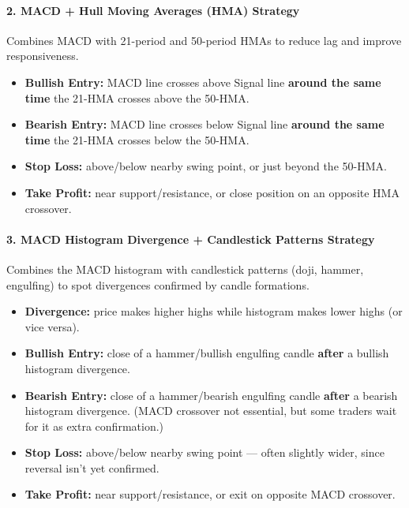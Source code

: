 \documentclass[12pt,openany]{book}
\begin{document}
\paragraph{2. MACD + Hull Moving Averages (HMA) Strategy}

Combines MACD with 21-period and 50-period HMAs to reduce lag and improve responsiveness.

\begin{itemize}[leftmargin=*]
    \item \textbf{Bullish Entry:} MACD line crosses above Signal line \textbf{around the same time} the 21-HMA crosses above the 50-HMA.
    \item \textbf{Bearish Entry:} MACD line crosses below Signal line \textbf{around the same time} the 21-HMA crosses below the 50-HMA.
    \item \textbf{Stop Loss:} above/below nearby swing point, or just beyond the 50-HMA.
    \item \textbf{Take Profit:} near support/resistance, or close position on an opposite HMA crossover.
\end{itemize}

\paragraph{3. MACD Histogram Divergence + Candlestick Patterns Strategy}

Combines the MACD histogram with candlestick patterns (doji, hammer, engulfing) to spot divergences confirmed by candle formations.

\begin{itemize}[leftmargin=*]
    \item \textbf{Divergence:} price makes higher highs while histogram makes lower highs (or vice versa).
    \item \textbf{Bullish Entry:} close of a hammer/bullish engulfing candle \textbf{after} a bullish histogram divergence.
    \item \textbf{Bearish Entry:} close of a hammer/bearish engulfing candle \textbf{after} a bearish histogram divergence. (MACD crossover not essential, but some traders wait for it as extra confirmation.)
    \item \textbf{Stop Loss:} above/below nearby swing point --- often slightly wider, since reversal isn't yet confirmed.
    \item \textbf{Take Profit:} near support/resistance, or exit on opposite MACD crossover.
\end{itemize}
\end{document}
